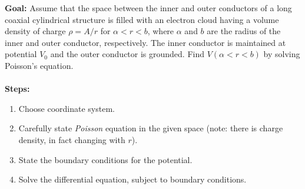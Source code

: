 \documentclass[../../header.tex]{subfiles}
\begin{document}
\textbf{Goal:} Assume that the space between the inner and outer conductors of a long coaxial cylindrical structure is filled with an electron cloud having a volume density of charge $\rho = A / r$ for $\alpha < r < b$, where $\alpha$ and $b$ are the radius of the inner and outer conductor, respectively. The inner conductor is maintained at potential $V_0$ and the outer conductor is grounded.  Find $V(\alpha < r < b)$ by solving Poisson's equation.\\
\\
\textbf{Steps:} 
\begin{enumerate}
\item Choose coordinate system. \\

\item Carefully state {\em Poisson} equation in the given space (note: there is charge density, in fact changing with $r$). \\

\item State the boundary conditions for the potential.  \\

\item Solve the differential equation, subject to boundary conditions. \\


\end{enumerate}
\end{document}
